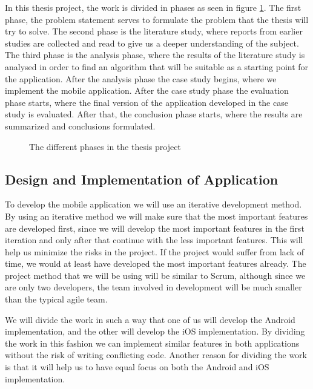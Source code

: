 \documentclass[12pt, a4paper, onecolumn]{article}
\begin{document}
	In this thesis project, the work is divided in phases as seen in figure \ref{fig:research-process}. The first phase, the problem statement serves to formulate the problem that the thesis will try to solve. The second phase is the literature study, where reports from earlier studies are collected and read to give us a deeper understanding of the subject. The third phase is the analysis phase, where the results of the literature study is analysed in order to find an algorithm that will be suitable as a starting point for the application. After the analysis phase the case study begins, where we implement the mobile application. After the case study phase the evaluation phase starts, where the final version of the application developed in the case study is evaluated. After that, the conclusion phase starts, where the results are summarized and conclusions formulated. 
	
	\begin{figure}[H]
		\centering
		\caption{The different phases in the thesis project}%
		\label{fig:research-process}%
	\end{figure}
	
	\subsection{Design and Implementation of Application}
	
	To develop the mobile application we will use an iterative development method. By using an iterative method we will make sure that the most important features are developed first, since we will develop the most important features in the first iteration and only after that continue with the less important features. This will help us  minimize the risks in the project. If the project would suffer from lack of time, we would at least have developed the most important features already. The project method that we will be using will be similar to Scrum, although since we are only two developers, the team involved in development will be much smaller than the typical agile team.
	
	We will divide the work in such a way that one of us will develop the Android implementation, and the other will develop the iOS implementation. By dividing the work in this fashion we can implement similar features in both applications without the risk of writing conflicting code. Another reason for dividing the work is that it will help us to have equal focus on both the Android and iOS implementation.
	
\end{document}
